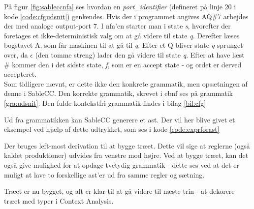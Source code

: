 \noindent På figur \ref{fig:sableccnfa} ses hvordan en \textit{port\_identifier} (defineret på linje 20 i kode \ref{code:cfgudsnit}) genkendes. Hvis der i programmet angives AQ\#7 arbejdes der med analoge output-port 7. I \gls{nfa}'en starter man i state \textit{s}, hvorefter der foretages et ikke-deterministisk valg om at gå videre til state  \textit{q}. Derefter læses bogstavet A, som får maskinen til at gå til \textit{q}. Efter et Q bliver state \textit{q} sprunget over, da $\epsilon$ (den tomme streng) lader den gå videre til state \textit{q}. Efter at have læst \# kommer den i det sidste state, \textit{f}, som er en accept state - og ordet er derved accepteret. \\

\noindent Som tidligere nævnt, er dette ikke den konkrete grammatik, men opsætningen af denne i SableCC. Den korrekte grammatik, skrevet i \gls{ebnf} ses på grammatik \ref{gra:udsnit}. Den fulde kontekstfri grammatik findes i bilag \ref{bil:cfg}



\noindent Ud fra grammatikken kan SableCC generere et \gls{ast}. Der vil her blive givet et eksempel ved hjælp af dette udtrykket, som ses i kode \ref{code:exprforast}


\noindent Der bruges left-most derivation til at bygge træet. Dette vil sige at reglerne (også kaldet produktioner) udvides fra venstre mod højre. Ved at bygge træet, kan det også give mulighed for at opdage tvetydig grammatik - dette ses ved at det er muligt at lave to forskellige \gls{ast}'er ud fra samme regler og sætning.


\noindent Træet er nu bygget, og alt er klar til at gå videre til næste trin - at dekorere træet med typer i Context Analysis.